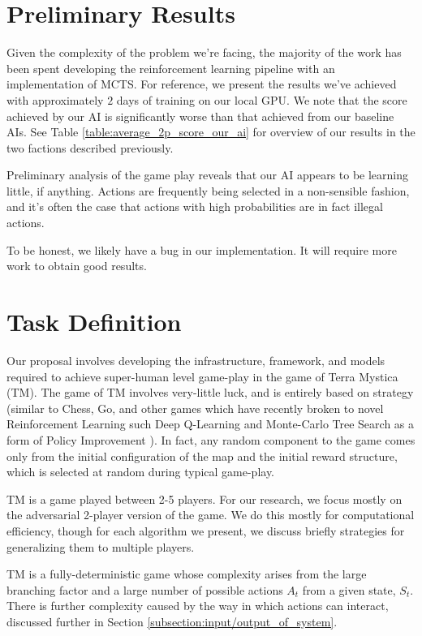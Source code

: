 \documentclass[12pt,twocolumn,letterpaper]{article}
\begin{document}
\section{Preliminary Results}
Given the complexity of the problem we're facing, the majority of the work has been spent developing the reinforcement learning pipeline with an implementation of MCTS. For reference, we present the results we've achieved with approximately $2$ days of training on our local GPU. We note that the score achieved by our AI is significantly worse than that achieved from our baseline AIs. See Table \ref{table:average_2p_score_our_ai} for overview of our results in the two factions described previously.

Preliminary analysis of the game play reveals that our AI appears to be learning little, if anything. Actions are frequently being selected in a non-sensible fashion, and it's often the case that actions with high probabilities are in fact illegal actions.

To be honest, we likely have a bug in our implementation. It will require more work to obtain good results.

\section{Task Definition}
\label{section:task_definition}
Our proposal involves developing the infrastructure, framework, and models required to achieve super-human level game-play in the game of Terra Mystica (TM).  The game of TM involves very-little luck, and is entirely based on strategy (similar to Chess, Go, and other games which have recently broken to novel Reinforcement Learning such Deep Q-Learning and Monte-Carlo Tree Search as a form of Policy Improvement \cite{AlphaGo} \cite{AlphaGoZero}). In fact, any random component to the game comes only from the initial configuration of the map and the initial reward structure, which is selected at random during typical game-play.

TM is a game played between 2-5 players. For our research, we focus mostly on the adversarial 2-player version of the game. We do this mostly for computational efficiency, though for each algorithm we present, we discuss briefly strategies for generalizing them to multiple players.

TM is a fully-deterministic game whose complexity arises from the large branching factor and a large number of possible actions $A_t$ from a given state, $S_t$. There is further complexity caused by the way in which actions can interact, discussed further in Section \ref{subsection:input/output_of_system}.
\end{document}
